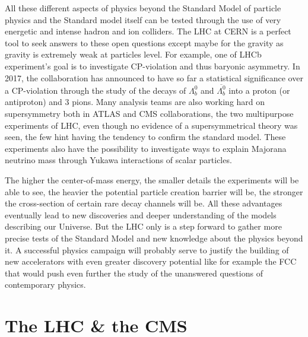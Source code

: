 	All these different aspects of physics beyond the Standard Model of particle physics and the Standard model itself can be tested through the use of very energetic and intense hadron and ion colliders. The LHC at CERN is a perfect tool to seek answers to these open questions except maybe for the gravity as gravity is extremely weak at particles level. For example, one of LHCb experiment's goal is to investigate CP-violation and thus baryonic asymmetry. In 2017, the collaboration has announced to have so far a  statistical significance over a CP-violation through the study of the decays of $\Lambda^0_b$ and $\overline{\Lambda^0_b}$ into a proton (or antiproton) and 3 pions. Many analysis teams are also working hard on supersymmetry both in ATLAS and CMS collaborations, the two multipurpose experiments of LHC, even though no evidence of a supersymmetrical theory was seen, the few hint having the tendency to confirm the standard model. These experiments also have the possibility to investigate ways to explain Majorana neutrino mass through Yukawa interactions of scalar particles.
	
	The higher the center-of-mass energy, the smaller details the experiments will be able to see, the heavier the potential particle creation barrier will be, the stronger the cross-section of certain rare decay channels will be. All these advantages eventually lead to new discoveries and deeper understanding of the models describing our Universe. But the LHC only is a step forward to gather more precise tests of the Standard Model and new knowledge about the physics beyond it. A successful physics campaign will probably serve to justify the building of new accelerators with even greater discovery potential like for example the \acf{FCC} that would push even further the study of the unanswered questions of contemporary physics.

\section{The \acl{LHC} \& the \acl{CMS}}
\label{chapt2:sec:LHC-CMS}


